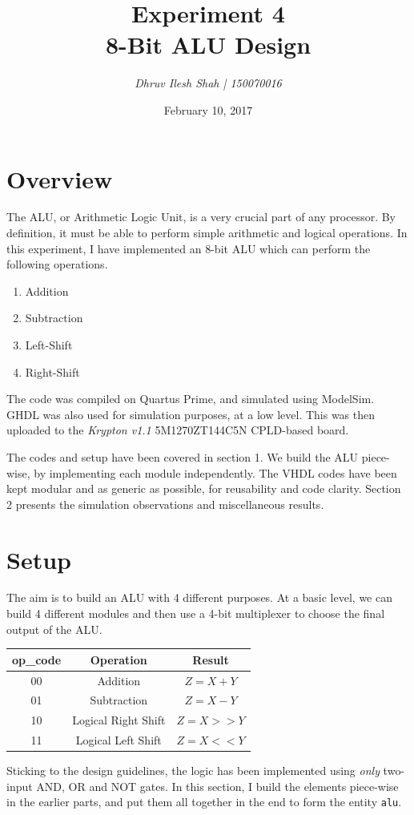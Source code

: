 \documentclass[a4paper, 11pt]{article}
\title{\bf Experiment 4\\\vspace*{2mm} 8-Bit ALU Design}
\author{\it Dhruv Ilesh Shah | 150070016}
\date{February 10, 2017}
\begin{document}
\maketitle
\section*{Overview}
The ALU, or Arithmetic Logic Unit, is a very crucial part of any processor. By definition, it must be able to perform simple arithmetic and logical operations. In this experiment, I have implemented an 8-bit ALU which can perform the following operations.
\begin{enumerate}

	\item Addition
	\item Subtraction
	\item Left-Shift
	\item Right-Shift
\end{enumerate}

The code was compiled on Quartus Prime, and simulated using ModelSim. GHDL was also used for simulation purposes, at a low level. This was then uploaded to the {\em Krypton v1.1} 5M1270ZT144C5N CPLD-based board.

The codes and setup have been covered in section 1. We build the ALU piece-wise, by implementing each module independently. The VHDL codes have been kept modular and as generic as possible, for reusability and code clarity. Section 2 presents the simulation observations and miscellaneous results.

\section{Setup}

The aim is to build an ALU with 4 different purposes. At a basic level, we can build 4 different modules and then use a 4-bit multiplexer to choose the final output of the ALU.
\begin{center}

\begin{tabular}{| c | c | c |}
\hline
\bf op\_code & \bf Operation & \bf Result  \\
\hline 
00 & Addition & $Z = X + Y$ \\
01 & Subtraction & $Z = X - Y$ \\
10 & Logical Right Shift & $Z = X >> Y$ \\
11 & Logical Left Shift & $Z = X << Y$ \\
\hline
\end{tabular}
\end{center}
Sticking to the design guidelines, the logic has been implemented using \emph{only} two-input AND, OR and NOT gates. In this section, I build the elements piece-wise in the earlier parts, and put them all together in the end to form the entity \texttt{alu}.
\end{document}
